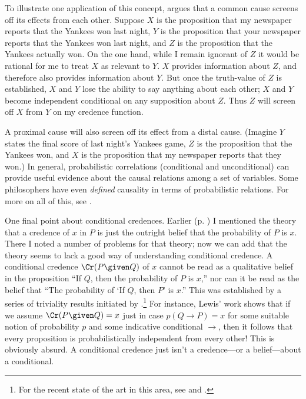 To illustrate one application of this concept, \citet{ReichenbachCommon} argues that a common cause screens off its effects from each other. Suppose $X$ is the proposition that my newspaper reports that the Yankees won last night, $Y$ is the proposition that your newspaper reports that the Yankees won last night, and $Z$ is the proposition that the Yankees actually won. On the one hand, while I remain ignorant of $Z$ it would be rational for me to treat $X$ as relevant to $Y$. $X$ provides information about $Z$, and therefore also provides information about $Y$. But once the truth-value of $Z$ is established, $X$ and $Y$ lose the ability to say anything about each other; $X$ and $Y$ become independent conditional on any supposition about $Z$. Thus $Z$ will screen off $X$ from $Y$ on my credence function.

A proximal cause will also screen off its effect from a distal cause. (Imagine $Y$ states the final score of last night's Yankees game, $Z$ is the proposition that the Yankees won, and $X$ is the proposition that my newspaper reports that they won.) In general, probabilistic correlations (conditional and unconditional) can provide useful evidence about the causal relations among a set of variables. Some philosophers have even \emph{defined} causality in terms of probabilistic relations. For more on all of this, see \citet{HitchcockSEP}.

One final point about conditional credences. Earlier (p. \pageref{titelbaum-outright}) I mentioned the theory that a credence of $x$ in $P$ is just the outright belief that the probability of $P$ is $x$. There I noted a number of problems for that theory; now we can add that the theory seems to lack a good way of understanding conditional credence. A conditional credence $\Cr(P \given Q)$ of $x$ cannot be read as a qualitative belief in the proposition ``If $Q$, then the probability of $P$ is $x$,'' nor can it be read as the belief that ``The probability of `If $Q$, then $P$' is $x$.'' This was established by a series of triviality results initiated by \citet{LewisProbCond}.\footnote
{For the recent state of the art in this area, see \citet{HajekTriviality} and \citet{FitelsonTriviality}.}
 For instance, Lewis' work shows that if we assume $\Cr(P \given Q)=x$ just in case $p(Q \rightarrow P)=x$ for some suitable notion of probability $p$ and some indicative conditional $\rightarrow$, then it follows that every proposition is probabilistically independent from every other! This is obviously absurd. A conditional credence just isn't a credence---or a belief---about a conditional. 

